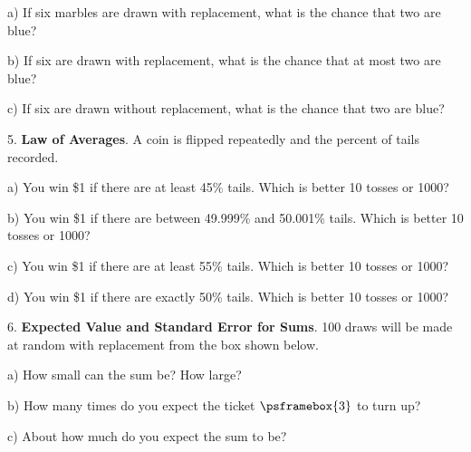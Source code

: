 \documentclass[10pt]{article}
\begin{document}
\hspace{10pt} a) If six marbles are drawn with replacement, what is the chance that two are blue?
\vspace{1in}

\hspace{10pt} b) If six  are drawn with replacement, what is the chance that at most two are blue?
\vspace{1.5in}

\hspace{10pt} c) If six  are drawn without replacement, what is the chance that two are blue?
\vfill
\eject

5. \textbf{Law of Averages}.  A coin is flipped repeatedly and the percent of tails recorded.

\hspace{10pt} a) You win \$1 if there are at least 45\% tails.  Which is better 10 tosses or 1000?
\vspace{.2in}

\hspace{10pt} b) You win \$1 if there are between  49.999\% and 50.001\% tails.  Which is better 10 tosses or 1000?
\vspace{.2in}

\hspace{10pt} c) You win \$1 if there are at least 55\% tails.  Which is better 10 tosses or 1000?
\vspace{.2in}

\hspace{10pt} d) You win \$1 if there are exactly  50\% tails. Which is better 10 tosses or 1000?
\vspace{.2in}

6. \textbf{Expected Value and Standard Error for Sums}.  
100 draws will be made at random with replacement
from the box shown below.\vspace{-20pt}
\begin{center}
\end{center}
\hspace{10pt} a)  How small can the sum be?  How large?
\vspace{.5in}

\hspace{10pt} b) How many times do you expect the ticket $\psframebox{3}$ to turn up?
\vspace{.4in}

\hspace{10pt} c) About how much do you expect the sum to be?
\vspace{.6in}
\end{document}

